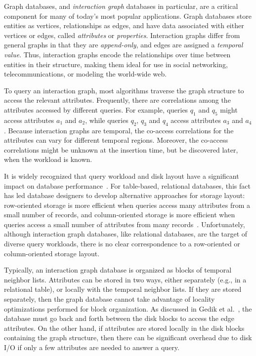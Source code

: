 

Graph databases, and \emph{interaction graph} databases in particular, are a
critical component for many of today's most popular applications.  Graph
databases store entities as vertices, relationships as edges, and have data
associated with either vertices or edges, called \emph{attributes} or
\emph{properties}.  Interaction graphs differ from general graphs in that they
are \emph{append-only}, and edges are assigned a \emph{temporal value}.  Thus,
interaction graphs encode the relationships over time between entities in
their structure, making them ideal for use in social networking,
telecommunications, or modeling the world-wide web.

To query an interaction graph, most algorithms traverse the graph structure to
access the relevant attributes.  Frequently, there are correlations among the
attributes accessed by different queries. For example, queries $q_1$ and $q_5$
might access attributes $a_1$ and $a_2$, while queries $q_2$, $q_3$ and $q_4$
access attributes $a_3$ and $a_4$. Because interaction graphs are temporal,
the co-access correlations for the attributes can vary for different temporal
regions.  Moreover, the co-access correlations might be unknown at the
insertion time, but be discovered later, when the workload is known.

It is widely recognized that query workload and disk layout have a significant
impact on database performance~\cite{alagiannis14,grund10,stonebraker05}.  For
table-based, relational databases, this fact has led database designers to
develop alternative approaches for storage layout: row-oriented storage is
more efficient when queries access many attributes from a small number of
records, and column-oriented storage is more efficient when queries access a
small number of attributes from many records~\cite{stonebraker05}. 
Unfortunately, although interaction graph databases, like relational
databases, are the target of diverse query workloads, there is no clear
correspondence to a row-oriented or column-oriented storage layout.

Typically, an interaction graph database is organized as blocks of temporal
neighbor lists.  Attributes can be stored in two ways, either separately
(e.g., in a relational table), or locally with the temporal neighbor lists. 
If they are stored separately, then the graph database cannot take advantage
of locality optimizations performed for block organization.  As discussed in
Gedik et al.~\cite{gedik14}, the database must go back and forth between the
disk blocks to access the edge attributes.  On the other hand, if attributes
are stored locally in the disk blocks containing the graph structure, then
there can be significant overhead due to disk I/O if only a few attributes are
needed to answer a query.

